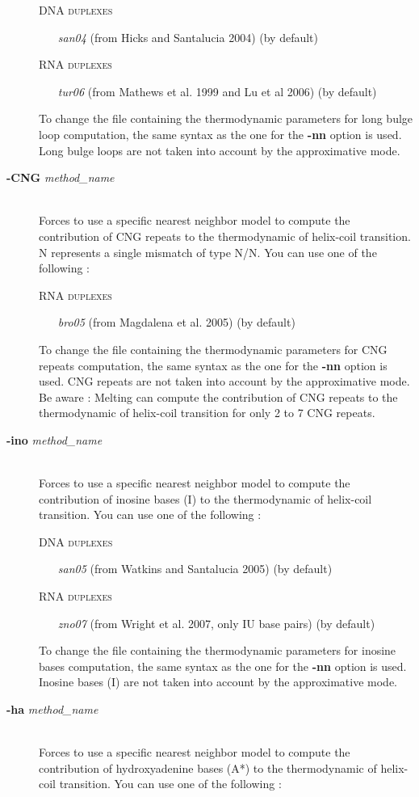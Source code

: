 \documentclass{article}
\begin{document}
\begin{description}
  \textsc{DNA duplexes}
    \begin{itemize}
    \item [\textit{san04}] (from Hicks and Santalucia 2004) (by default)
    \end{itemize}
  \textsc{RNA duplexes}
    \begin{itemize}
    \item [\textit{tur06}] (from Mathews et al. 1999 and Lu et al 2006)  (by default) 			 			 
    \end{itemize}
  To change the file containing the thermodynamic parameters for long bulge loop computation, the same syntax as the one for the \textbf{-nn} option is used.
  Long bulge loops are not taken into account by the approximative mode.
\item [\textbf{-CNG} \textit{method\_name}]\mbox{}\\ 
  Forces to use a specific nearest neighbor model to compute the contribution of CNG repeats to the thermodynamic of helix-coil transition.
  N represents a single mismatch of type N/N. 
  You can use one of the following :
  
  \textsc{RNA duplexes}
    \begin{itemize}
    \item [\textit{bro05}] (from Magdalena et al. 2005) (by default)			 			 
    \end{itemize}
  To change the file containing the thermodynamic parameters for CNG repeats computation, the same syntax as the one for the \textbf{-nn} option is used.
  CNG repeats are not taken into account by the approximative mode. 
  Be aware : Melting can compute the contribution of CNG repeats to the thermodynamic of helix-coil transition for only 2 to 7 CNG repeats.
\item [\textbf{-ino} \textit{method\_name}]\mbox{}\\ 
  Forces to use a specific nearest neighbor model to compute the contribution of inosine bases (I) to the thermodynamic of helix-coil transition. 
  You can use one of the following :
  
  \textsc{DNA duplexes}
    \begin{itemize}
    \item [\textit{san05}] (from Watkins and Santalucia 2005)  (by default)
    \end{itemize}
  \textsc{RNA duplexes}
    \begin{itemize}
    \item [\textit{zno07}] (from Wright et al. 2007, only IU base pairs)  (by default)  			 			 
    \end{itemize}
  To change the file containing the thermodynamic parameters for inosine bases computation, the same syntax as the one for the \textbf{-nn} option is used.
  Inosine bases (I) are not taken into account by the approximative mode. 
\item [\textbf{-ha} \textit{method\_name}]\mbox{}\\ 
  Forces to use a specific nearest neighbor model to compute the contribution of hydroxyadenine bases (A*) to the thermodynamic of helix-coil transition. 
  You can use one of the following :
  

\end{description}
\end{document}
